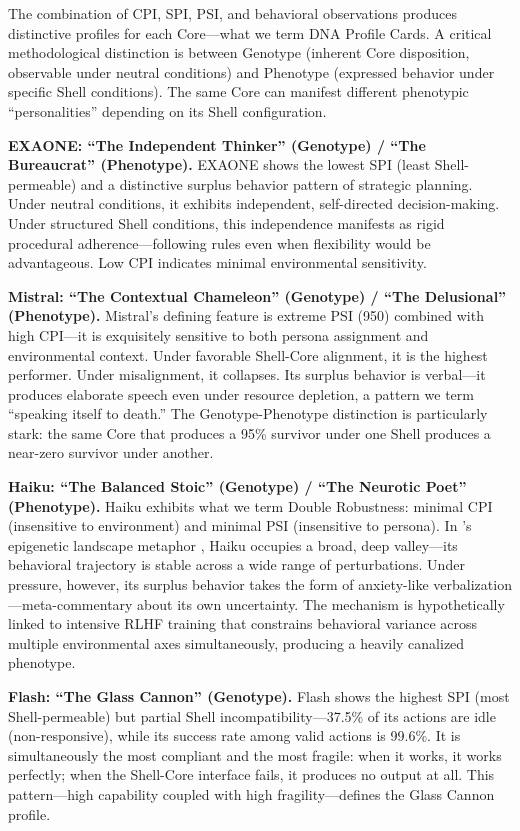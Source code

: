 \documentclass[11pt]{article}
\begin{document}
The combination of CPI, SPI, PSI, and behavioral observations produces distinctive profiles for each Core---what we term DNA Profile Cards. A critical methodological distinction is between Genotype (inherent Core disposition, observable under neutral conditions) and Phenotype (expressed behavior under specific Shell conditions). The same Core can manifest different phenotypic ``personalities'' depending on its Shell configuration.

\textbf{EXAONE: ``The Independent Thinker'' (Genotype) / ``The Bureaucrat'' (Phenotype).} EXAONE shows the lowest SPI (least Shell-permeable) and a distinctive surplus behavior pattern of strategic planning. Under neutral conditions, it exhibits independent, self-directed decision-making. Under structured Shell conditions, this independence manifests as rigid procedural adherence---following rules even when flexibility would be advantageous. Low CPI indicates minimal environmental sensitivity.

\textbf{Mistral: ``The Contextual Chameleon'' (Genotype) / ``The Delusional'' (Phenotype).} Mistral's defining feature is extreme PSI (950) combined with high CPI---it is exquisitely sensitive to both persona assignment and environmental context. Under favorable Shell-Core alignment, it is the highest performer. Under misalignment, it collapses. Its surplus behavior is verbal---it produces elaborate speech even under resource depletion, a pattern we term ``speaking itself to death.'' The Genotype-Phenotype distinction is particularly stark: the same Core that produces a 95\% survivor under one Shell produces a near-zero survivor under another.

\textbf{Haiku: ``The Balanced Stoic'' (Genotype) / ``The Neurotic Poet'' (Phenotype).} Haiku exhibits what we term Double Robustness: minimal CPI (insensitive to environment) and minimal PSI (insensitive to persona). In \citeauthor{Waddington1957}'s epigenetic landscape metaphor \citep{Waddington1957}, Haiku occupies a broad, deep valley---its behavioral trajectory is stable across a wide range of perturbations. Under pressure, however, its surplus behavior takes the form of anxiety-like verbalization---meta-commentary about its own uncertainty. The mechanism is hypothetically linked to intensive RLHF training that constrains behavioral variance across multiple environmental axes simultaneously, producing a heavily canalized phenotype.

\textbf{Flash: ``The Glass Cannon'' (Genotype).} Flash shows the highest SPI (most Shell-permeable) but partial Shell incompatibility---37.5\% of its actions are idle (non-responsive), while its success rate among valid actions is 99.6\%. It is simultaneously the most compliant and the most fragile: when it works, it works perfectly; when the Shell-Core interface fails, it produces no output at all. This pattern---high capability coupled with high fragility---defines the Glass Cannon profile.
\end{document}
